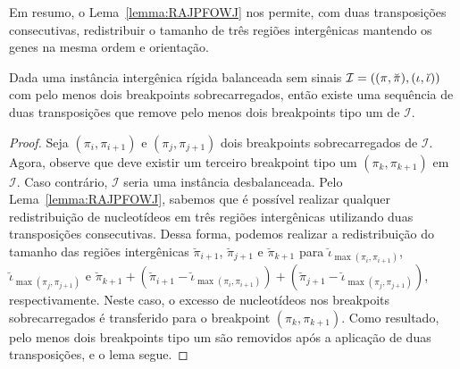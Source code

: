 Em resumo, o Lema~\ref{lemma:RAJPFOWJ} nos permite, com duas transposições consecutivas, redistribuir o tamanho de três regiões intergênicas mantendo os genes na mesma ordem e orientação.

\begin{lemma}\label{lemma:FSGHLWJU}
Dada uma instância intergênica rígida balanceada sem sinais $\mathcal{I}=((\pi,\breve\pi),\break(\iota,\breve\iota))$ com pelo menos dois breakpoints sobrecarregados, então existe uma sequência de duas transposições que remove pelo menos dois breakpoints tipo um de $\mathcal{I}$.
\end{lemma}
\begin{proof}
Seja $(\pi_i,\pi_{i+1})$ e $(\pi_j,\pi_{j+1})$ dois breakpoints sobrecarregados de $\mathcal{I}$.
Agora, observe que deve existir um terceiro breakpoint tipo um $(\pi_k,\pi_{k+1})$ em $\mathcal{I}$. Caso contrário, $\mathcal{I}$ seria uma instância desbalanceada. Pelo Lema~\ref{lemma:RAJPFOWJ}, sabemos que é possível realizar qualquer redistribuição de nucleotídeos em três regiões intergênicas utilizando duas transposições consecutivas. Dessa forma, podemos realizar a redistribuição do tamanho das regiões intergênicas $\breve\pi_{i+1}$, $\breve\pi_{j+1}$ e $\breve\pi_{k+1}$ para $\breve\iota_{\max(\pi_i,\pi_{i+1})}$, $\breve\iota_{\max(\pi_j,\pi_{j+1})}$ e $\breve\pi_{k+1} + (\breve\pi_{i+1} - \breve\iota_{\max(\pi_i,\pi_{i+1})}) + (\breve\pi_{j+1} - \breve\iota_{\max(\pi_j,\pi_{j+1})})$, respectivamente. Neste caso, o excesso de nucleotídeos nos breakpoits sobrecarregados é transferido para o breakpoint $(\pi_k,\pi_{k+1})$. Como resultado, pelo menos dois breakpoints tipo um são removidos após a aplicação de duas transposições, e o lema segue.
\end{proof}


